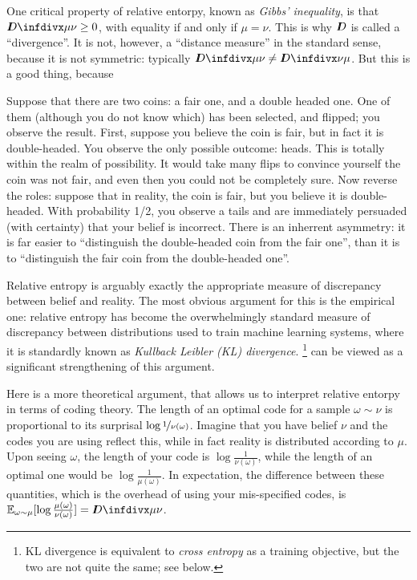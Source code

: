 One critical property of relative entorpy, known as \emph{Gibbs' inequality}, is that
$\kldiv{\mu}{\nu} \ge 0$,
with equality if and only if $\mu = \nu$. 
This is why $I\mkern-8muD$ is called a ``divergence''. 
It is not, however, a ``distance measure'' in the standard sense, because it is not symmetric: typically $\kldiv{\mu}{\nu} \ne \kldiv{\nu}{\mu}$. 
%
But this is a good thing, because
%

\begin{example}
        \label{ex:coin-unknown-bias}
    Suppose that there are two coins: a fair one, and a double headed one. 
    One of them (although you do not know which) has been selected, and flipped; you observe the result. 
%
    First, suppose you believe the coin is fair, but in fact it is double-headed. 
    You observe the only possible outcome: heads. This is totally within the realm of possibility. It would take many flips to convince yourself the coin was not fair, and even then you could not be completely sure. 
    Now reverse the roles: suppose that in reality, the coin is fair, but you believe it is double-headed. With probability 1/2, you observe a tails and are immediately persuaded (with certainty) that your belief is incorrect. 
%
    There is an inherrent asymmetry: it is far easier to ``distinguish the double-headed coin from the fair one'', than it is to ``distinguish the fair coin from the double-headed one''.
\end{example}

Relative entropy is arguably exactly the appropriate measure of discrepancy between belief and reality. 
The most obvious argument for this is the empirical one:
relative entropy has become the overwhelmingly standard measure of discrepancy between distributions used to train machine learning systems, where it is standardly known as \emph{Kullback Leibler (KL) divergence}.%
\footnote{KL divergence is equivalent to \emph{cross entropy} as a training objective, but the two are not quite the same; see below.}
 can be viewed as a significant strengthening of this argument.


Here is a more theoretical argument, that allows us to interpret relative entorpy in terms of coding theory. 
The length of an optimal code for a sample $\omega \sim \nu$ is proportional to its surprisal $\log \nicefrac1{\nu(\omega)}$.
Imagine that you have belief $\nu$ and the codes you are using reflect this, while in fact reality is distributed according to $\mu$.
Upon seeing $\omega$, the length of your code is $\log\frac{1}{\nu(\omega)}$, while the length of an optimal one would be $\log\frac{1}{\mu(\omega)}$. 
In expectation, the difference between these quantities,
    which is the overhead of using your mis-specified codes, is 
     $\Ex_{\omega \sim \mu}[ \log \frac{\mu(\omega)}{\nu(\omega)}] = \kldiv\mu\nu$.


